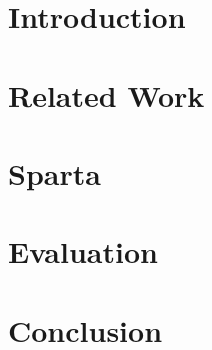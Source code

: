 \documentclass[runningheads]{llncs}
\begin{document}
\section{Introduction}
\label{sec:intro}


\section{Related Work}
\label{sec:relate_work}


\section{Sparta}
\label{sec:Sparta}


\section{Evaluation}
\label{sec:eval}


\section{Conclusion}
\label{sec:conclusion}



%
%
%


% 
\end{document}
